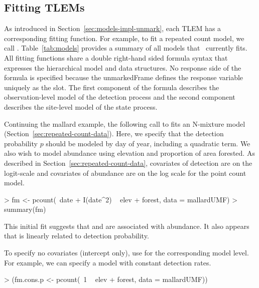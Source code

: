 \documentclass[article,shortnames]{jss}
\newcommand{\um}{\pkg{unmarked}}
\begin{document}



\subsection{Fitting TLEMs}
\label{sec:fitting-models}

As introduced in Section~\ref{sec:models-impl-unmark}, each TLEM has a
corresponding fitting function.  For example, to fit a repeated count
model, we call .  Table~\ref{tab:models} provides a
summary of all models that \um\ currently fits.  All fitting functions
share a double right-hand sided formula syntax that expresses the
hierarchical model and data structures.  No response side of the formula is
specified because the unmarkedFrame defines the response variable
uniquely as the  slot.  The first component of the formula
describes the observation-level model of the detection process and the
second component describes the site-level model of the state process.

Continuing the mallard example, the following call to 
fits an N-mixture model (Section~\ref{sec:repeated-count-data}).  Here,
we specify that the detection probability $p$ should be modeled by day
of year, including a quadratic term.  We also wish to model abundance
using elevation and proportion of area forested.  As described in
Section~\ref{sec:repeated-count-data}, covariates of detection are on the
logit-scale and covariates of abundance are on the log scale for the
point count model.

\begin{Schunk}
\begin{Sinput}
> fm <- pcount(~date + I(date^2) ~ elev + forest, data = mallardUMF)
> summary(fm)
\end{Sinput}
\end{Schunk}

This initial fit suggests that  and  are
associated with abundance.  It also appears that  is
linearly related to detection probability.

To specify no covariates (intercept only), use  for the
corresponding model level.  For example, we can specify a model with
constant detection rates.


\begin{Schunk}
\begin{Sinput}
> (fm.cons.p <- pcount(~1 ~ elev + forest, data = mallardUMF))
\end{Sinput}
\end{Schunk}
\end{document}
